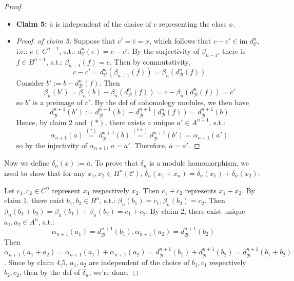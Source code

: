 \begin{proof}
\begin{itemize}
        \item \textbf{Claim 5:} $\overline{a}$ is independent of the choice of $c$ representing the class $x$.
        \item \begin{proof}
            \textit{of claim 5:} Suppose that $\overline{c'} = \overline{c} =x$, which follows that $c-c'\in \text{im }d_\mathcal{C}^n$, i.e.: $e \in C^{n-1}$, s.t.: $d^n_\mathcal{C} (e)=c-c'$. By the surjectivity of $\beta_{n-1}$, there is $f \in B^{n-1}$, s.t.: $\beta_{n-1} (f)=e$. Then by commutativity,
            \[
            c-c'= d^n_\mathcal{C} (\beta_{n-1}(f)) = \beta_n (d^{n}_\mathcal{B} (f))
            \]
            Consider $b':= b- d^n_\mathcal{B} (f)$. Then
            \[
            \beta_n (b') = \beta_n (b)- \beta_n (d^n_\mathcal{B} (f)) =c- \beta_n (d^n_\mathcal{B} (f)) =c'
            \]
            so $b'$ is a preimage of $c'$. By the def of cohomology modules, we then have
            \begin{equation*}
                d^{n+1}_\mathcal{B} (b'):= d^{n+1}_\mathcal{B}(b) - d^{n+1}_\mathcal{B} (d^{n}_\mathcal{B} (f)) = d^{n+1}_\mathcal{B}(b) \tag{**}
            \end{equation*}
            Hence, by claim 2 and $(*)$, there exists a unique $a' \in A^{n+1}$, s.t.:
            \[
            \alpha_{n+1} (a) \overset{(*)}{=} d^{n+1}_\mathcal{B} (b) \overset{(**)}{=} d^{n+1}_\mathcal{B} (b') = \alpha_{n+1} (a')
            \]
            so by the injectivity of $\alpha_{n+1}$, $a=a'$. Therefore, $\overline{a} = \overline{a'}$.
        \end{proof}
    \end{itemize}
    Now we define $\delta_n (x) := \overline{a}$. To prove that $\delta_n$ is a module homomorphism, we need to show that for any $x_1 ,x_2 \in H^n(\mathcal{C})$, $\delta_n(x_1+x_n)= \delta_n(x_1) +\delta_n (x_2)$:

    Let $c_1,c_2 \in C^n$ represent $x_1$ respectively $x_2$. Then $c_1+c_2$ represents $x_1 + x_2$. By claim 1, there exist $b_1,b_2 \in B^n$, s.t.: $\beta_n (b_1)= c_1, \beta_n (b_2)=c_2$. Then $\beta_n (b_1+b_2)= \beta_n (b_1)+ \beta_n(b_2)= c_1+c_2$. By claim 2, there exist unique $a_1,a_2\in A^n$, s.t.:
    \[
    \alpha_{n+1} (a_1)= d^{n+1}_\mathcal{B} (b_1) ,\alpha_{n+1} (a_2)= d^{n+1}_\mathcal{B}(b_2)
    \]
    Then $\alpha_{n+1} (a_1+a_2)= \alpha_{n+1} (a_1) +\alpha_{n+1} (a_2)= d^{n+1}_\mathcal{B}(b_1) +d^{n+1}_\mathcal{B}(b_2) = d^{n+1}_\mathcal{B}(b_1+b_2)$. Since by claim 4,5, $a_1,a_2$ are independent of the choice of $b_1,c_1$ respectively $b_2,c_2$, then by the def of $\delta_n$, we're done.
\end{proof}

